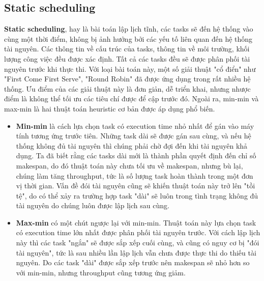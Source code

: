 \documentclass{my_style}
\begin{document}
\subsection{Static scheduling}
\textbf{Static scheduling}, hay là bài toán lập lịch tĩnh, các tasks sẽ đến hệ thống vào cùng một thời điểm, không bị ảnh hưởng bởi các yếu tố liên quan đến hệ thống tài nguyên. Các thông tin về cấu trúc của tasks, thông tin về môi trường, khối lượng công việc đều được xác định. Tất cả các tasks đều sẽ được phân phối tài nguyên trước khi thực thi. Với loại bài toán này, một số giải thuật "cổ điển" như "First Come First Serve", "Round Robin" đã được ứng dụng trong rất nhiều hệ thống. Ưu điểm của các giải thuật này là đơn giản, dễ triển khai, nhưng nhược điểm là không thể tối ưu các tiêu chí được để cập trước đó. Ngoài ra, min-min và max-min là hai thuật toán heuristic cơ bản được áp dụng phổ biến.
\begin{itemize}
	\item \textbf{Min-min}\cite{13} là cách lựa chọn task có execution time nhỏ nhất để gán vào máy tính tương ứng trước tiên. Những task dài sẽ được gán sau cùng, và nếu hệ thống không đủ tài nguyên thì chúng phải chờ đợi đến khi tài nguyên khả dụng. Ta đã biết rằng các tasks dài mới là thành phần quyết định đến chỉ số makespan, do đó thuật toán này chưa tối ưu về makespan, nhưng bù lại, chúng làm tăng throughput, tức là số lượng task hoàn thành trong một đơn vị thời gian. Vấn đề đói tài nguyên cũng sẽ khiến thuật toán này trở lên "tồi tệ", do có thể xảy ra trường hợp task "dài" sẽ luôn trong tình trạng không đủ tài nguyên do chúng luôn được lập lịch sau cùng. 
	\item \textbf{Max-min}\cite{14} có một chút ngược lại với min-min. Thuật toán này lựa chọn task có execution time lớn nhất được phân phối tài nguyên trước. Với cách lập lịch này thì các task "ngắn" sẽ được sắp xếp cuối cùng, và cũng có nguy cơ bị "đói tài nguyên", tức là sau nhiều lần lập lịch vẫn chưa được thực thi do thiếu tài nguyên. Do các task "dài" được sắp xếp trước nên makespan sẽ nhỏ hơn so với min-min, nhưng throughput cũng tương ứng giảm. 
\end{itemize}
\end{document}
